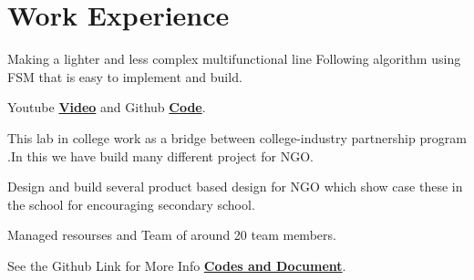 \documentclass[]{font}
\begin{document}
\begin{minipage}[t]{0.35\textwidth}
\sectionsep



%
%

\end{minipage} 
\hfill
\begin{minipage}[t]{0.64\textwidth} 


\section{Work Experience}

\vspace{\topsep} %
\begin{tightemize}
\item Making a lighter and less complex multifunctional line Following algorithm
using​ ​ FSM​ that is easy to implement and build.
\item Youtube \textbf{\href{https://youtu.be/FhUvQlrLWxc}{Video}} and Github \textbf{\href{https://github.com/pranav083/FSM_code}{Code}}. 
\end{tightemize}
\sectionsep

\vspace{\topsep} %
\begin{tightemize}
\item This lab in college work as a bridge between college-industry partnership program .In this we have build many different project for NGO.
\item Design and build several product based design for NGO which show
case these in the school for encouraging secondary school.
\item Managed resourses and Team of around 20 team members. 
\item See the Github Link for More Info \textbf{\href{https://github.com/pranav083/Tinkering_project}{Codes and Document}}.	
\end{tightemize}
\sectionsep


\end{minipage}
\end{document}
